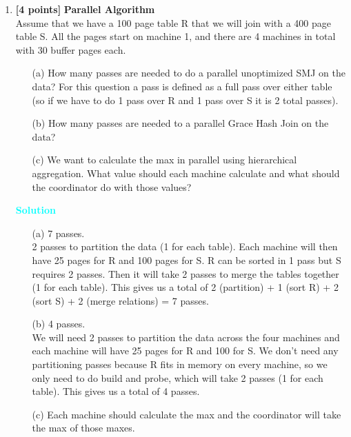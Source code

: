 \documentclass[10pt]{article}
\newenvironment{solution}
    { \begin{mdframed}[backgroundcolor=gray!10] \textcolor{cyan}{\textbf{Solution}} \\}
    {  \end{mdframed}}
\begin{document}
\begin{enumerate}
	\item \textbf{[4 points]} \textbf{Parallel Algorithm} \\
	      Assume that we have a 100 page table R that we will join with a 400 page table S.
	      All the pages start on machine 1, and there are 4 machines in total with 30 buffer pages each.
	      \begin{itemize}
		      \item[(a)] How many passes are needed to do a parallel unoptimized SMJ on the data? For
		            this question a pass is defined as a full pass over either table (so if we have to do 1 pass over R and 1 pass
		            over S it is 2 total passes).
		      \item[(b)] How many passes are needed to a parallel Grace Hash Join on the data?
		      \item[(c)] We want to calculate the max in parallel using hierarchical aggregation. What value should
		            each machine calculate and what should the coordinator do with those values?
	      \end{itemize}
	      \begin{solution}
		      \begin{itemize}
			      \item[(a)] 7 passes.\\
			            2 passes to partition the data (1 for each table). Each machine will then have 25 pages for R
			            and 100 pages for S. R can be sorted in 1 pass but S requires 2 passes. Then it will take 2 passes
			            to merge the tables together (1 for each table). This gives us a total of 2 (partition) + 1 (sort R)
			            + 2 (sort S) + 2 (merge relations) = 7 passes.
			      \item[(b)] 4 passes. \\
			            We will need 2 passes to partition the data across the four machines and each machine
			            will have 25 pages for R and 100 for S. We don't need any partitioning passes because R fits in
			            memory on every machine, so we only need to do build and probe, which will take 2 passes (1 for
			            each table). This gives us a total of 4 passes.
			      \item[(c)] Each machine should calculate the max and the coordinator will take the max of those maxes.
		      \end{itemize}
	      \end{solution}

\end{enumerate}
\end{document}
